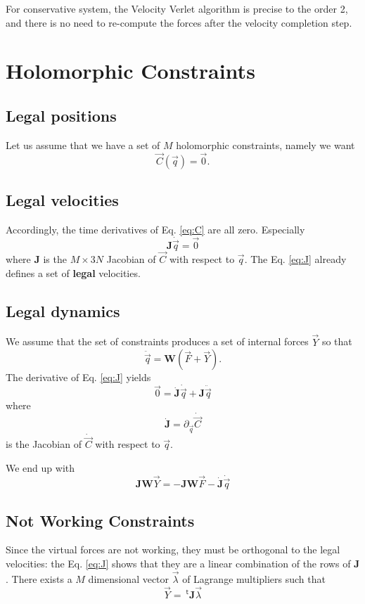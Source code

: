 \documentclass[aps,twocolumn]{revtex4}
\newcommand{\mymat}[1]{\boldsymbol{#1}}
\newcommand{\mytrn}[1]{{\!\!~^{\mathsf{t}}{#1}}}
\begin{document}
For conservative system, the Velocity Verlet algorithm is precise to the order 2, and there is
no need to re-compute the forces after the velocity completion step.

\section{Holomorphic Constraints}
\subsection{Legal positions}

Let us assume that we have a set of $M$ holomorphic constraints, namely we want
\begin{equation}
	\label{eq:C}
	\vec{C}\left(\vec{q}\right) = \vec{0}.
\end{equation}

\subsection{Legal velocities}
Accordingly, the time derivatives of Eq. \eqref{eq:C} are all zero.
Especially
\begin{equation}
	\label{eq:J}
	\mymat{J}\dot{\vec{q}} = \vec{0}
\end{equation}
where $\mymat{J}$ is the $M\times 3N$ Jacobian of $\vec{C}$ with respect to $\vec{q}$.
The Eq. \eqref{eq:J} already defines a set of \textbf{legal} velocities.

\subsection{Legal dynamics}
We assume that the set of constraints produces a set of internal forces $\vec{Y}$ so that
\begin{equation}
	\ddot{\vec{q}} = \mymat{W} \left( \vec{F} + \vec{Y} \right).
\end{equation}
The derivative of Eq. \eqref{eq:J} yields
\begin{equation}
	\vec{0} = \dot{\mymat{J}}\dot{\vec{q}} + \mymat{J}\ddot{\vec{q}}
\end{equation}
where
\begin{equation}
	\dot{\mymat{J}} = \partial_{\vec{q}} \dot{\vec{C}}
\end{equation}
is the Jacobian of $\dot{\vec{C}}$ with respect to $\vec{q}$.

We end up with
\begin{equation}
	\mymat{J}\mymat{W}\vec{Y} = 
	-\mymat{J}\mymat{W}\vec{F} - \dot{\mymat{J}}\dot{\vec{q}}
\end{equation}

\subsection{Not Working Constraints}
Since the virtual forces are not working, they must be orthogonal to the legal velocities: the Eq. \eqref{eq:J}
shows that they are a linear combination of the rows of $\mymat{J}$.
There exists a $M$ dimensional vector $\vec{\lambda}$ 
of Lagrange multipliers
such that
\begin{equation}
	\vec{Y} = \mytrn{\mymat{J}}\vec{\lambda}
\end{equation}
\end{document}
